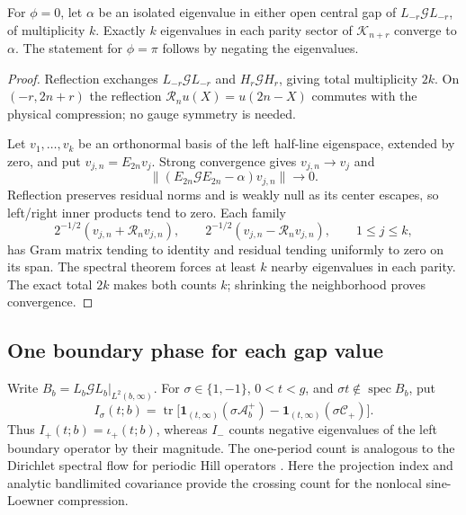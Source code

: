 \begin{corollary}
\label{v11:cor:gap-parity}
For $\phi=0$, let $\alpha$ be an isolated eigenvalue in either open
central gap of $L_{-r}\mathcal G L_{-r}$, of multiplicity $k$.
Exactly $k$ eigenvalues in each parity sector of $\mathcal K_{n+r}$
converge to $\alpha$.  The statement for $\phi=\pi$ follows by negating
the eigenvalues.
\end{corollary}
\begin{proof}
Reflection exchanges $L_{-r}\mathcal G L_{-r}$ and
$H_r\mathcal G H_r$, giving total multiplicity $2k$.
On $(-r,2n+r)$ the reflection $\mathcal R_nu(X)=u(2n-X)$ commutes
with the physical compression; no gauge symmetry is needed.

Let $v_1,\ldots,v_k$ be an orthonormal basis of the left half-line
eigenspace, extended by zero, and put $v_{j,n}=E_{2n}v_j$.
Strong convergence gives $v_{j,n}\to v_j$ and
\[
 \|(E_{2n}\mathcal G E_{2n}-\alpha)v_{j,n}\|\to0.
\]
Reflection preserves residual norms and is weakly null as its center
escapes, so left/right inner products tend to zero. Each family
\[
 2^{-1/2}(v_{j,n}+\mathcal R_nv_{j,n}),\qquad
 2^{-1/2}(v_{j,n}-\mathcal R_nv_{j,n}),\qquad1\le j\le k,
\]
has Gram matrix tending to identity and residual tending uniformly to
zero on its span. The spectral theorem forces at least $k$ nearby
eigenvalues in each parity. The exact total $2k$ makes both counts
$k$; shrinking the neighborhood proves convergence.
\end{proof}

\subsection{One boundary phase for each gap value}
\label{boundary:sec:one-cell-flow}

Write $B_b=L_b\mathcal G L_b|_{L^2(b,\infty)}$.  For
$\sigma\in\{1,-1\}$, $0<t<g$, and $\sigma t\notin\operatorname{spec}B_b$,
put
\[
 I_\sigma(t;b)=\operatorname{tr}\bigl[
 \mathbf1_{(t,\infty)}(\sigma\mathscr A_b^+)
 -\mathbf1_{(t,\infty)}(\sigma\mathscr C_+)\bigr].
\]
Thus $I_+(t;b)=\iota_+(t;b)$, whereas $I_-$ counts negative eigenvalues
of the left boundary operator by their magnitude.
The one-period count is analogous to the Dirichlet spectral flow for
periodic Hill operators \cite[Proposition~3.21]{Gontier2020}.
Here the projection index and analytic bandlimited covariance provide
the crossing count for the nonlocal sine-Loewner compression.

